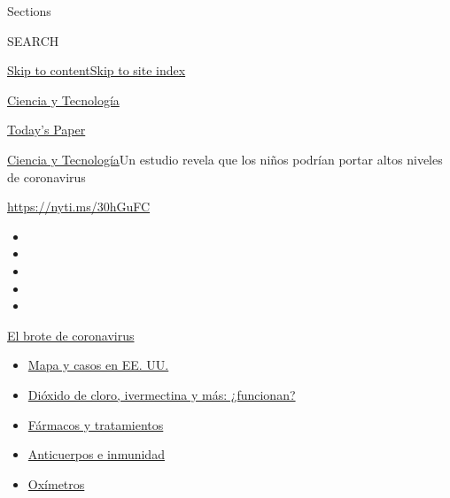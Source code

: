Sections

SEARCH

\protect\hyperlink{site-content}{Skip to
content}\protect\hyperlink{site-index}{Skip to site index}

\href{https://www.nytimes3xbfgragh.onion/es/section/ciencia-y-tecnologia}{Ciencia
y Tecnología}

\href{https://myaccount.nytimes3xbfgragh.onion/auth/login?response_type=cookie\&client_id=vi}{}

\href{https://www.nytimes3xbfgragh.onion/section/todayspaper}{Today's
Paper}

\href{/es/section/ciencia-y-tecnologia}{Ciencia y
Tecnología}\textbar{}Un estudio revela que los niños podrían portar
altos niveles de coronavirus

\url{https://nyti.ms/30hGuFC}

\begin{itemize}
\item
\item
\item
\item
\item
\end{itemize}

\href{https://www.nytimes3xbfgragh.onion/es/spotlight/coronavirus?action=click\&pgtype=Article\&state=default\&region=TOP_BANNER\&context=storylines_menu}{El
brote de coronavirus}

\begin{itemize}
\tightlist
\item
  \href{https://www.nytimes3xbfgragh.onion/es/interactive/2020/espanol/mundo/coronavirus-en-estados-unidos.html?action=click\&pgtype=Article\&state=default\&region=TOP_BANNER\&context=storylines_menu}{Mapa
  y casos en EE. UU.}
\item
  \href{https://www.nytimes3xbfgragh.onion/es/2020/07/23/espanol/america-latina/bolivia-cloro-coronavirus-ivermectina.html?action=click\&pgtype=Article\&state=default\&region=TOP_BANNER\&context=storylines_menu}{Dióxido
  de cloro, ivermectina y más: ¿funcionan?}
\item
  \href{https://www.nytimes3xbfgragh.onion/es/interactive/2020/science/coronavirus-tratamientos-curas.html?action=click\&pgtype=Article\&state=default\&region=TOP_BANNER\&context=storylines_menu}{Fármacos
  y tratamientos}
\item
  \href{https://www.nytimes3xbfgragh.onion/es/2020/07/28/espanol/ciencia-y-tecnologia/anticuerpos-coronavirus-inmunidad.html?action=click\&pgtype=Article\&state=default\&region=TOP_BANNER\&context=storylines_menu}{Anticuerpos
  e inmunidad}
\item
  \href{https://www.nytimes3xbfgragh.onion/es/2020/04/29/espanol/estilos-de-vida/oximetro-para-que-sirve.html?action=click\&pgtype=Article\&state=default\&region=TOP_BANNER\&context=storylines_menu}{Oxímetros}
\end{itemize}

